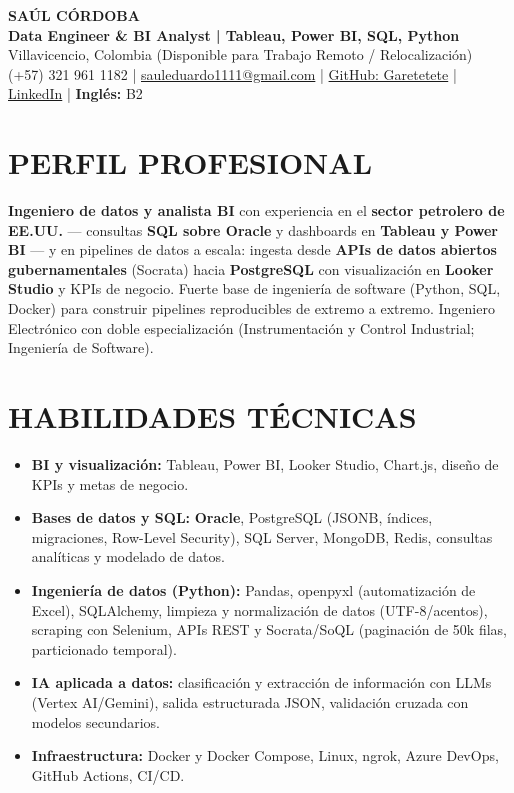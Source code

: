\documentclass[letterpaper,10pt]{article}
\begin{document}
\begin{center}
    {\Huge \bfseries SAÚL CÓRDOBA} \\[3pt]
    {\Large \textbf{Data Engineer \& BI Analyst | Tableau, Power BI, SQL, Python}} \\[2pt]
    Villavicencio, Colombia (Disponible para Trabajo Remoto / Relocalización) \\
    (+57) 321 961 1182 | \href{mailto:sauleduardo1111@gmail.com}{sauleduardo1111@gmail.com} | \href{https://github.com/Garetetete}{GitHub: Garetetete} | \href{https://www.linkedin.com/in/saul-cordoba-a2997427b}{LinkedIn} | \textbf{Inglés:} B2
\end{center}

\section{PERFIL PROFESIONAL}
\textbf{Ingeniero de datos y analista BI} con experiencia en el \textbf{sector petrolero de EE.UU.} — consultas \textbf{SQL sobre Oracle} y dashboards en \textbf{Tableau y Power BI} — y en pipelines de datos a escala: ingesta desde \textbf{APIs de datos abiertos gubernamentales} (Socrata) hacia \textbf{PostgreSQL} con visualización en \textbf{Looker Studio} y KPIs de negocio. Fuerte base de ingeniería de software (Python, SQL, Docker) para construir pipelines reproducibles de extremo a extremo. Ingeniero Electrónico con doble especialización (Instrumentación y Control Industrial; Ingeniería de Software).

\section{HABILIDADES TÉCNICAS}
\begin{itemize}
    \item \textbf{BI y visualización:} Tableau, Power BI, Looker Studio, Chart.js, diseño de KPIs y metas de negocio.
    \item \textbf{Bases de datos y SQL:} \textbf{Oracle}, PostgreSQL (JSONB, índices, migraciones, Row-Level Security), SQL Server, MongoDB, Redis, consultas analíticas y modelado de datos.
    \item \textbf{Ingeniería de datos (Python):} Pandas, openpyxl (automatización de Excel), SQLAlchemy, limpieza y normalización de datos (UTF-8/acentos), scraping con Selenium, APIs REST y Socrata/SoQL (paginación de 50k filas, particionado temporal).
    \item \textbf{IA aplicada a datos:} clasificación y extracción de información con LLMs (Vertex AI/Gemini), salida estructurada JSON, validación cruzada con modelos secundarios.
    \item \textbf{Infraestructura:} Docker y Docker Compose, Linux, ngrok, Azure DevOps, GitHub Actions, CI/CD.
\end{itemize}
\end{document}
